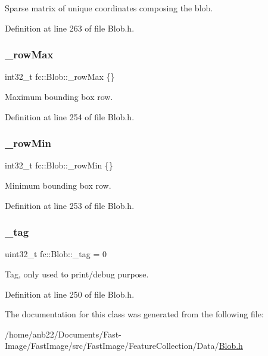 Sparse matrix of unique coordinates composing the blob. 



Definition at line 263 of file Blob.\+h.

\mbox{\label{classfc_1_1Blob_ada6057ee4bf33c0a432f28d5d42413dd}} 
\subsubsection{\texorpdfstring{\+\_\+row\+Max}{\_rowMax}}
{\footnotesize\ttfamily int32\+\_\+t fc\+::\+Blob\+::\+\_\+row\+Max \{\}\hspace{0.3cm}{\ttfamily [private]}}



Maximum bounding box row. 



Definition at line 254 of file Blob.\+h.

\mbox{\label{classfc_1_1Blob_ab63888a3d59cb3b81ad10e19864b101a}} 
\subsubsection{\texorpdfstring{\+\_\+row\+Min}{\_rowMin}}
{\footnotesize\ttfamily int32\+\_\+t fc\+::\+Blob\+::\+\_\+row\+Min \{\}\hspace{0.3cm}{\ttfamily [private]}}



Minimum bounding box row. 



Definition at line 253 of file Blob.\+h.

\mbox{\label{classfc_1_1Blob_af07e1270217289a0879386f267bf5fe5}} 
\subsubsection{\texorpdfstring{\+\_\+tag}{\_tag}}
{\footnotesize\ttfamily uint32\+\_\+t fc\+::\+Blob\+::\+\_\+tag = 0\hspace{0.3cm}{\ttfamily [private]}}



Tag, only used to print/debug purpose. 



Definition at line 250 of file Blob.\+h.



The documentation for this class was generated from the following file\+:\begin{DoxyCompactItemize}
\item 
/home/anb22/\+Documents/\+Fast-\/\+Image/\+Fast\+Image/src/\+Fast\+Image/\+Feature\+Collection/\+Data/\hyperlink{Blob_8h}{Blob.\+h}\end{DoxyCompactItemize}
